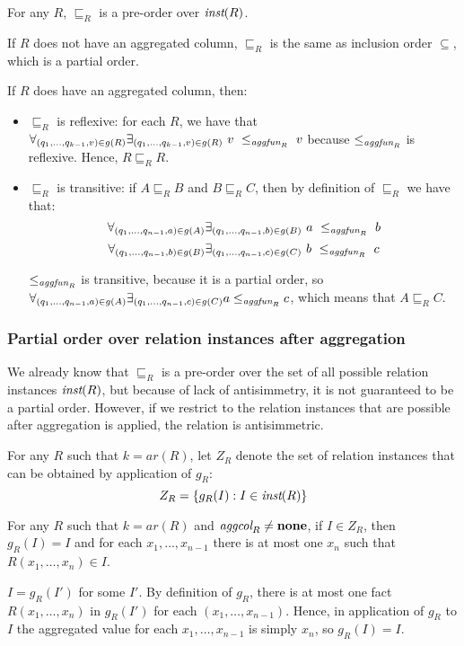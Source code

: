 \begin{lem}
For any $R$, $\sqsubseteq_R$ is a pre-order over $\textit{inst}(R)$.
\end{lem}\label{lem:preorder}

\begin{prof}

If $R$ does not have an aggregated column, $\sqsubseteq_R$ is the same as inclusion order $\subseteq$, which is a partial order.

If $R$ does have an aggregated column, then:

\begin{itemize}
\item $\sqsubseteq_R$ is reflexive: for each $R$, we have that  $\forall_{(q_1, ..., q_{k-1}, v) \in g(R)} \exists_{(q_1, ..., q_{k-1}, v) \in g(R)}~v~\le_{\textit{aggfun}_R}~v$ because $\le_{\textit{aggfun}_R}$ is reflexive. Hence, $R \sqsubseteq_R R$.
\item $\sqsubseteq_R$ is transitive: if $A \sqsubseteq_R B$ and $B \sqsubseteq_R  C$, then by definition of $\sqsubseteq_R$ we have that: $$\forall_{(q_1, ..., q_{n-1}, a) \in g(A)} \exists_{(q_1, ..., q_{n-1}, b) \in g(B)}~a~\le_{\textit{aggfun}_R}~b $$ $$\forall_{(q_1, ..., q_{n-1}, b) \in g(B)} \exists_{(q_1, ..., q_{n-1}, c) \in g(C)}~b~\le_{\textit{aggfun}_R}~c$$

$\le_{\textit{aggfun}_R}$ is transitive, because it is a partial order, so $\forall_{(q_1, ..., q_{n-1}, a) \in g(A)} \exists_{(q_1, ..., q_{n-1}, c) \in g(C)} a \le_{\textit{aggfun}_R} c $, which means that $A \sqsubseteq_R C$.
\end{itemize}

\end{prof}

\subsubsection{Partial order over relation instances after aggregation}

We already know that $\sqsubseteq_R$ is a pre-order over the set of all possible relation instances $\textit{inst}(R)$, but because of lack of antisimmetry, it is not guaranteed to be a partial order. However, if we restrict to the relation instances that are possible after aggregation is applied, the relation is antisimmetric.

For any $R$ such that $k=ar(R)$, let $Z_R$ denote the set of relation instances that can be obtained by application of $g_R$:
$$Z_R = \{g_R(I): I \in \textit{inst}(R)\}$$


\begin{lem}
For any $R$ such that $k=ar(R)$ and $\textit{aggcol}_R \ne {\bf none}$, if $I \in Z_R$, then $g_R(I) = I$ and for each $x_1, \dots, x_{n-1}$ there is at most one $x_n$ such that $R(x_1, \dots, x_n) \in I$.
\end{lem}\label{lem:fixgr}
\begin{prof}
$I = g_R(I')$ for some $I'$. By definition of $g_R$, there is at most one fact $R(x_1, \dots, x_n)$ in $g_R(I')$ for each $(x_1, \dots, x_{n-1})$. Hence, in application of $g_R$ to $I$ the aggregated value for each $x_1, \dots, x_{n-1}$ is simply $x_n$, so $g_R(I) = I$.
\end{prof}

